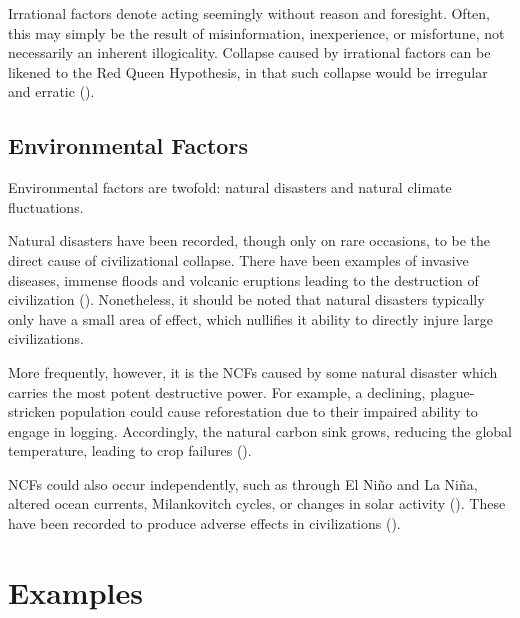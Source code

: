 \documentclass[12pt, a4paper, twoside]{article}
\begin{document}
Irrational factors denote acting seemingly without reason and foresight. Often, this may simply be the result of misinformation, inexperience, or misfortune, not necessarily an inherent illogicality. Collapse caused by irrational factors can be likened to the Red Queen Hypothesis, in that such collapse would be irregular and erratic (\cite{kemp2019collapse}). 

\subsection{Environmental Factors}

Environmental factors are twofold: natural disasters and natural climate fluctuations. 

Natural disasters have been recorded, though only on rare occasions, to be the direct cause of civilizational collapse. There have been examples of invasive diseases, immense floods and volcanic eruptions leading to the destruction of civilization (\cites[p.\ 289]{ehrenpreis2022historical}[p.\ 1]{rincon2014doggerland}). Nonetheless, it should be noted that natural disasters typically only have a small area of effect, which nullifies it ability to directly injure large civilizations. 

More frequently, however, it is the NCFs caused by some natural disaster which carries the most potent destructive power. For example, a declining, plague-stricken population could cause reforestation due to their impaired ability to engage in logging. Accordingly, the natural carbon sink grows, reducing the global temperature, leading to crop failures (\cites[p.\ 9]{nevle2011neotropical}{juurakko2021cold}). 

NCFs could also occur independently, such as through El Niño and La Niña, altered ocean currents, Milankovitch cycles, or changes in solar activity (\cites[p.\ 1]{loury2016drought}[p.\ 6]{berger2006equatorial}[pp.\ 5–6]{lockwood2010cold}). These have been recorded to produce adverse effects in civilizations (\cite[p.\ 292]{columbia2010angkor}).

\section{Examples}
\end{document}
